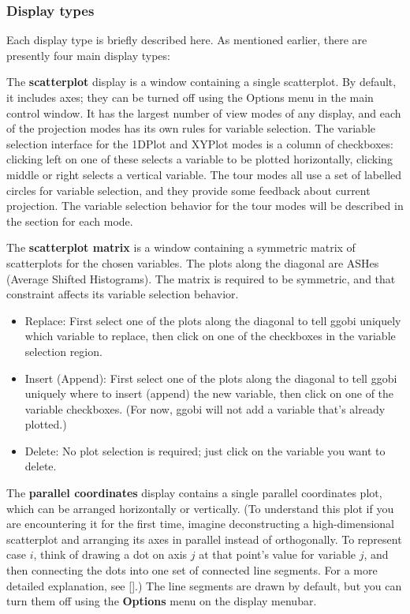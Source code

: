 \documentclass[11pt]{article}
\begin{document}
\subsubsection{Display types}
\label{DisplayTypes}

Each display type is briefly described here. 
As mentioned earlier, there are presently four main display types:

The {\bf scatterplot} display is a window containing a single
scatterplot.  By default, it includes axes; they can be turned off
using the Options menu in the main control window.  It has the
largest number of view modes of any display, and each of the
projection modes has its own rules for variable selection.  The
variable selection interface for the 1DPlot and XYPlot modes is a
column of checkboxes: clicking left on one of these selects a
variable to be plotted horizontally, clicking middle or right selects
a vertical variable.  The tour modes all use a set of labelled
circles for variable selection, and they provide some feedback about
current projection.  The variable selection behavior for the tour
modes will be described in the section for each mode.

The {\bf scatterplot matrix} is a window containing a symmetric matrix
of scatterplots for the chosen variables.  The plots along the diagonal
are ASHes (Average Shifted Histograms).  The matrix is required to be
symmetric, and that constraint affects its variable selection behavior.

\begin{itemize}
\item Replace:  First select one of the plots along the diagonal
  to tell ggobi uniquely which variable to replace, then click on
  one of the checkboxes in the variable selection region.
\item Insert (Append):  First select one of the plots along the
  diagonal to tell ggobi uniquely where to insert (append) the new
  variable, then click on one of the variable checkboxes.  (For now,
  ggobi will not add a variable that's already plotted.)
\item Delete:  No plot selection is required; just click on the
  variable you want to delete.
\end{itemize}

The {\bf parallel coordinates} display contains a single parallel
coordinates plot, which can be arranged horizontally or vertically.
(To understand this plot if you are encountering it for the first time, 
imagine deconstructing a high-dimensional scatterplot and arranging
its axes in parallel instead of orthogonally.  To represent case $i$,
think of drawing a dot on axis $j$ at that point's value for variable
$j$, and then connecting the dots into one set of connected line segments.
For a more detailed explanation, see [].)  The line segments are drawn
by default, but you can turn them off using the {\bf Options} menu
on the display menubar.
\end{document}
